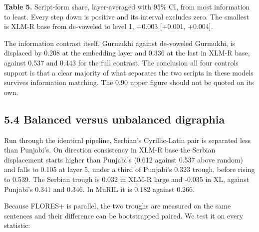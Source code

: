 \textbf{Table 5.} Script-form share, layer-averaged with 95\% CI, from
most information to least. Every step down is positive and its interval
excludes zero. The smallest is XLM-R base from de-voweled to level 1,
+0.003 {[}+0.001, +0.004{]}.

The information contrast itself, Gurmukhi against de-voweled Gurmukhi,
is displaced by 0.208 at the embedding layer and 0.336 at the last in
XLM-R base, against 0.537 and 0.443 for the full contrast. The
conclusion all four controls support is that a clear majority of what
separates the two scripts in these models survives information matching.
The 0.90 upper figure should not be quoted on its own.

\hypertarget{balanced-versus-unbalanced-digraphia}{%
\subsection{5.4 Balanced versus unbalanced
digraphia}\label{balanced-versus-unbalanced-digraphia}}

Run through the identical pipeline, Serbian's Cyrillic-Latin pair is
separated less than Punjabi's. On direction consistency in XLM-R base
the Serbian displacement starts higher than Punjabi's (0.612 against
0.537 above random) and falls to 0.105 at layer 5, under a third of
Punjabi's 0.323 trough, before rising to 0.539. The Serbian trough is
0.032 in XLM-R large and -0.035 in XL, against Punjabi's 0.341 and
0.346. In MuRIL it is 0.182 against 0.266.

Because FLORES+ is parallel, the two troughs are measured on the same
sentences and their difference can be bootstrapped paired. We test it on
every statistic:

